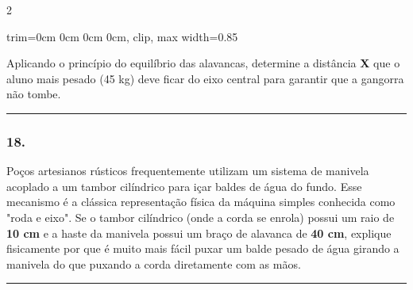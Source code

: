 \documentclass[twoside, 10pt, a4paper]{article}
\newlength{\espacoPreQuestao}
\newlength{\espacoQuestao}
\newcommand{\larguraTikz}{0.85\linewidth} %
\begin{document}
\begin{multicols*}{2}
\begin{center}
\begin{adjustbox}{trim=0cm 0cm 0cm 0cm, clip, max width=\larguraTikz}
\end{adjustbox}
\end{center}
Aplicando o princípio do equilíbrio das alavancas, determine a distância \textbf{X} que o aluno mais pesado (45 kg) deve ficar do eixo central para garantir que a gangorra não tombe.
\par\vspace{\espacoQuestao}

\noindent\textcolor{CorLinha}{\rule{\linewidth}{0.5pt}} 
\par\vspace{\espacoPreQuestao}
\subsubsection*{18.} Poços artesianos rústicos frequentemente utilizam um sistema de manivela acoplado a um tambor cilíndrico para içar baldes de água do fundo. Esse mecanismo é a clássica representação física da máquina simples conhecida como "roda e eixo". Se o tambor cilíndrico (onde a corda se enrola) possui um raio de \textbf{10 cm} e a haste da manivela possui um braço de alavanca de \textbf{40 cm}, explique fisicamente por que é muito mais fácil puxar um balde pesado de água girando a manivela do que puxando a corda diretamente com as mãos.
\par\vspace{\espacoQuestao}

\noindent\textcolor{CorLinha}{\rule{\linewidth}{0.5pt}}
\par\vspace{\espacoPreQuestao}

\end{multicols*}
\end{document}
